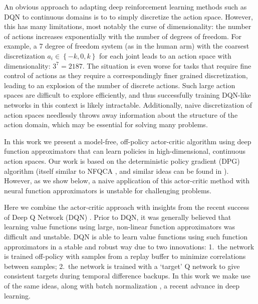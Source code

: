 \documentclass{article} %
\begin{document}

An obvious approach to adapting deep reinforcement learning
methods such as DQN to continuous
domains is to to simply discretize the action space. However, this
has many limitations, most notably the curse of dimensionality:
the number of actions increases exponentially
with the number of degrees of freedom. For example, a 7 degree of
freedom system (as in the human arm) with the coarsest discretization
$a_{i} \in \left\{ -k, 0, k \right\}$ for each joint leads to an
action space with dimensionality: $3^7 = 2187$.  The situation is even
worse for tasks that require fine control of actions as they require
a correspondingly finer grained discretization, leading to an
explosion of the number of discrete actions. Such large action spaces
are difficult to explore efficiently, and thus successfully training
DQN-like networks in this context is likely intractable.
Additionally, naive discretization of action spaces needlessly throws
away information about the structure of the action domain, which may be
essential for solving many problems.

In this work we present a model-free, off-policy actor-critic
algorithm using deep function approximators that can learn policies
in high-dimensional, continuous action spaces.  Our work is
based on the
deterministic policy gradient (DPG)
algorithm \citep{silver2014deterministic} (itself similar to NFQCA
\citep{hafner2011reinforcement}, and similar ideas can be found in
\citep{prokhorov1997adaptive}). However, as we show below,
a naive application of this actor-critic method with
neural function approximators is unstable for challenging problems.

Here we combine the actor-critic approach with insights from the
recent success of Deep Q Network (DQN) \citep{mnih2013playing,
  mnih2015human}.  Prior to DQN, it was generally believed that
learning value functions using large, non-linear function
approximators was difficult and unstable.  DQN is able to learn value
functions using such function approximators in a stable and robust way
due to two innovations: 1.\ the network is trained off-policy with
samples from a replay buffer to minimize correlations between samples;
2.\ the network is trained with a ‘target’ Q network to give
consistent targets during temporal difference backups.  In this work
we make use of the same ideas, along with batch normalization
\citep{ioffe2015batch}, a recent advance in deep learning.
\end{document}

